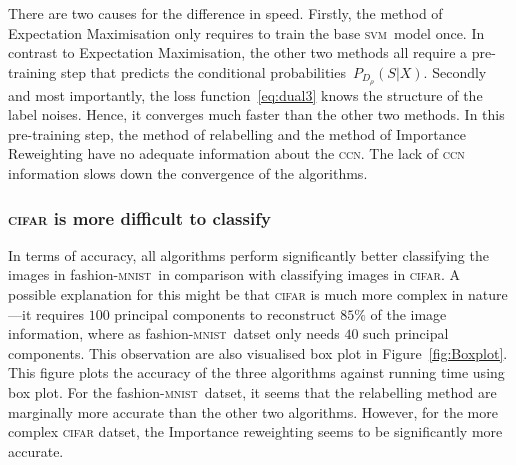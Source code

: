 \documentclass[12pt]{article} %
\newcommand{\svm}{\textsc{svm}}
\newcommand{\mnist}{fashion-\textsc{mnist}}
\begin{document}
There are two  causes for the difference in speed.
Firstly, the method of Expectation Maximisation only requires to train the base \svm\ model once.
In contrast to Expectation Maximisation, the other two methods all require a pre-training step that predicts the conditional probabilities~$P_{D_\rho}(S|X)$.
Secondly and most importantly, the loss function~\eqref{eq:dual3} knows the structure of the label noises. Hence, it converges much faster than the other two methods.
In this pre-training step, the method of relabelling and the method of Importance Reweighting have no adequate information about the \textsc{ccn}.
The lack of \textsc{ccn} information slows down the convergence of the algorithms.

\subsubsection{\textsc{cifar} is more difficult to classify}
In terms of accuracy, all algorithms perform significantly better classifying the images in \mnist\ in comparison with classifying images in \textsc{cifar}.
A possible explanation for this might be that \textsc{cifar} is much more complex in nature---it requires $100$ principal components to reconstruct $85\%$ of the image information, where as \mnist\ datset only needs $40$ such principal components.
This observation are also visualised box plot in Figure~\ref{fig:Boxplot}. This figure plots the accuracy of the three algorithms against running time using box plot. For the \mnist\  datset, it seems that the relabelling method are marginally more accurate than the other two algorithms. However, for the  more complex \textsc{cifar} datset, the Importance reweighting seems to be significantly more accurate.
\end{document}
